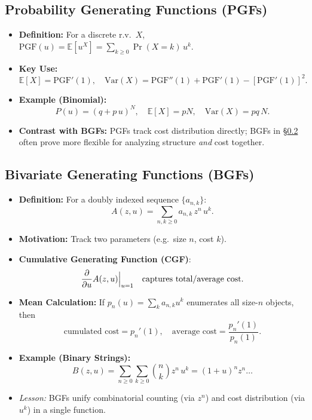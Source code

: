 \documentclass[11pt,letterpaper]{article}
\begin{document}
\subsection{Probability Generating Functions (PGFs)}
\begin{itemize}
  \item \textbf{Definition:} For a discrete r.v.\ \(X\), \(\text{PGF}(u)=\mathbb{E}[u^X] = \sum_{k\ge0}\Pr(X=k)\,u^k.\)
  \item \textbf{Key Use:} 
    \[
      \mathbb{E}[X]=\text{PGF}'(1), 
      \quad \mathrm{Var}(X)=\text{PGF}''(1)+\text{PGF}'(1)-[\text{PGF}'(1)]^2.
    \]
  \item \textbf{Example (Binomial):}
    \[
      P(u) = (q + p\,u)^N,\quad \mathbb{E}[X]=pN,\quad \mathrm{Var}(X)=pq\,N.
    \]
  \item \textbf{Contrast with BGFs:} PGFs track cost distribution directly; BGFs in \S\ref{sec:bivariate} often prove more flexible for analyzing structure \emph{and} cost together.
\end{itemize}

\subsection{Bivariate Generating Functions (BGFs)}
\label{sec:bivariate}
\begin{itemize}
  \item \textbf{Definition:} For a doubly indexed sequence \(\{a_{n,k}\}\):
    \[
      A(z,u)=\sum_{n,k\ge0} a_{n,k}\,z^n\,u^k.
    \]
  \item \textbf{Motivation:} Track two parameters (e.g.\ size \(n\), cost \(k\)). 
  \item \textbf{Cumulative Generating Function (CGF)}:
    \[
      \frac{\partial}{\partial u}A(z,u)\Bigl|_{u=1} \quad\text{captures total/average cost.}
    \]
  \item \textbf{Mean Calculation:} If \(p_{n}(u)=\sum_k a_{n,k}u^k\) enumerates all size-\(n\) objects, then
    \[
      \text{cumulated cost} = p_n'(1),\quad
      \text{average cost} = \frac{p_n'(1)}{p_n(1)}.
    \]
  \item \textbf{Example (Binary Strings):}
    \[
      B(z,u)=\sum_{n\ge0}\sum_{k\ge0}\binom{n}{k}z^n\,u^k=(1+u)^n z^n \dots
    \]
  \item \emph{Lesson:} BGFs unify combinatorial counting (via \(z^n\)) and cost distribution (via \(u^k\)) in a single function.
\end{itemize}
\end{document}

